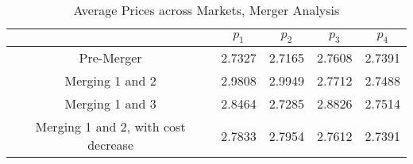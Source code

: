 
\begin{table}
\centering
\begin{tabular}{ |c|c|c|c|c|}
 \hline
 & $p_1$ & $p_2$ & $p_3$ & $p_4$ \\
 \hline
 Pre-Merger & 2.7327 & 2.7165  & 2.7608 & 2.7391 \\
 \hline
 Merging 1 and 2 & 2.9808 & 2.9949 & 2.7712 & 2.7488 \\
 \hline
 Merging 1 and 3 & 2.8464 & 2.7285 & 2.8826 & 2.7514\\
 \hline
 Merging 1 and 2, with cost decrease & 2.7833 & 2.7954 & 2.7612 & 2.7391\\
 \hline
\end{tabular}
\label{table6_1}
\caption{Average Prices across Markets, Merger Analysis}
\end{table}
